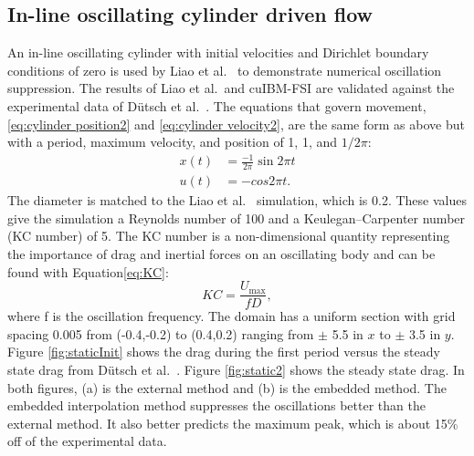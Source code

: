 \documentclass[preprint,12pt,5p]{elsarticle}
\begin{document}
\subsection{In-line oscillating cylinder driven flow}
\label{sec:Oscillating Cylinder in no Flow}
An in-line oscillating cylinder with initial velocities and Dirichlet boundary conditions of zero is used by Liao et al.~\cite{liao2010simulating} to demonstrate numerical oscillation suppression. 
The results of Liao et al.~and cuIBM-FSI are validated against the experimental data of D\"{u}tsch et al.~\cite{dutsch1998low}. 
The equations that govern movement, \eqref{eq:cylinder position2} and \eqref{eq:cylinder velocity2}, are the same form as above but with a period, maximum velocity, and position of 1, 1, and $1/2\pi$:
\begin{align}
x(t)&=\frac{-1}{2\pi}\sin{2\pi t}\label{eq:cylinder position2}\\
u(t)&=-cos{2\pi t}.\;\label{eq:cylinder velocity2}
\end{align}
The diameter is matched to the Liao et al.~\cite{liao2010simulating} simulation, which is 0.2. 
These values give the simulation a Reynolds number of 100 and a Keulegan–Carpenter number (KC number) of 5. 
The KC number is a non-dimensional quantity representing the importance of drag and inertial forces on an oscillating body and can be found with Equation\eqref{eq:KC}:
\begin{equation}
KC = \frac{U_\text{max}}{fD} \label{eq:KC},
\end{equation}
where f is the oscillation frequency. 
The domain has a uniform section with grid spacing 0.005 from (-0.4,-0.2) to (0.4,0.2) ranging from $\pm$ 5.5 in $x$ to $\pm$ 3.5 in $y$. 
Figure \ref{fig:staticInit} shows the drag during the first period versus the steady state drag from D\"{u}tsch et al.~\cite{dutsch1998low}. 
Figure \ref{fig:static2} shows the steady state drag. 
In both figures, (a) is the external method and (b) is the embedded method.
The embedded interpolation method suppresses the oscillations better than the external method. It also better predicts the maximum peak, which is about 15\% off of the experimental data.
\end{document}

